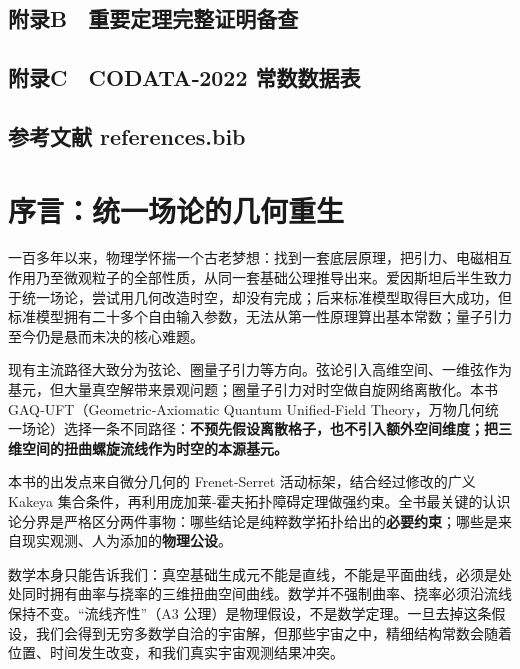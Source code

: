 \subsection{附录B 重要定理完整证明备查}\label{ux9644ux5f55b-ux91cdux8981ux5b9aux7406ux5b8cux6574ux8bc1ux660eux5907ux67e5}

\subsection{附录C CODATA‑2022
常数数据表}\label{ux9644ux5f55c-codata2022-ux5e38ux6570ux6570ux636eux8868}

\subsection{参考文献
references.bib}\label{ux53c2ux8003ux6587ux732e-references.bib}

\section{序言：统一场论的几何重生}\label{ux5e8fux8a00ux7edfux4e00ux573aux8bbaux7684ux51e0ux4f55ux91cdux751f}

一百多年以来，物理学怀揣一个古老梦想：找到一套底层原理，把引力、电磁相互作用乃至微观粒子的全部性质，从同一套基础公理推导出来。爱因斯坦后半生致力于统一场论，尝试用几何改造时空，却没有完成；后来标准模型取得巨大成功，但标准模型拥有二十多个自由输入参数，无法从第一性原理算出基本常数；量子引力至今仍是悬而未决的核心难题。

现有主流路径大致分为弦论、圈量子引力等方向。弦论引入高维空间、一维弦作为基元，但大量真空解带来景观问题；圈量子引力对时空做自旋网络离散化。本书
GAQ‑UFT（Geometric‑Axiomatic Quantum Unified‑Field
Theory，万物几何统一场论）选择一条不同路径：\textbf{不预先假设离散格子，也不引入额外空间维度；把三维空间的扭曲螺旋流线作为时空的本源基元。}

本书的出发点来自微分几何的 Frenet‑Serret 活动标架，结合经过修改的广义
Kakeya
集合条件，再利用庞加莱‑霍夫拓扑障碍定理做强约束。全书最关键的认识论分界是严格区分两件事物：哪些结论是纯粹数学拓扑给出的\textbf{必要约束}；哪些是来自现实观测、人为添加的\textbf{物理公设}。

数学本身只能告诉我们：真空基础生成元不能是直线，不能是平面曲线，必须是处处同时拥有曲率与挠率的三维扭曲空间曲线。数学并不强制曲率、挠率必须沿流线保持不变。``流线齐性''（A3
公理）是物理假设，不是数学定理。一旦去掉这条假设，我们会得到无穷多数学自洽的宇宙解，但那些宇宙之中，精细结构常数会随着位置、时间发生改变，和我们真实宇宙观测结果冲突。


